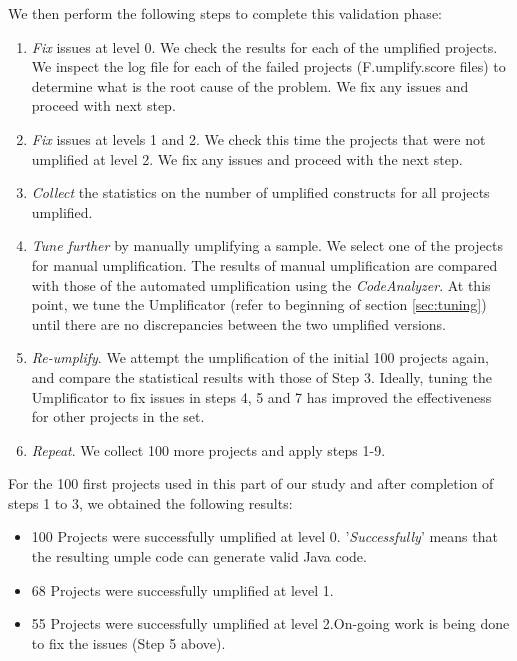 We then perform the following steps to complete this validation phase:

\begin{enumerate}[resume]
\item \textit{Fix} issues at level 0. We check the results for each of the umplified projects. We inspect the log file for each of the failed projects (F.umplify.score files) to determine what is the root cause of the problem. We fix any issues and proceed with next step.

\item \textit{Fix} issues at levels 1 and 2. We check this time the projects that were not umplified at level 2. We fix any issues and proceed with the next step.

\item \textit{Collect} the statistics on the number of umplified constructs for all projects umplified.

\item \textit{Tune further} by manually umplifying a sample. We select one of the projects for manual umplification. The results of manual umplification are compared with those of the automated umplification using the \textit{CodeAnalyzer}. At this point, we tune the Umplificator (refer to beginning of section \ref{sec:tuning}) until there are no discrepancies between the two umplified versions. 

\item \textit{Re-umplify}. We attempt the umplification of the initial 100 projects again, and compare the statistical results with those of Step 3. Ideally, tuning the Umplificator to fix issues in steps 4, 5 and 7 has improved the effectiveness for other projects in the set.

\item \textit{Repeat}. We collect 100 more projects and apply steps 1-9. 
\end{enumerate}

For the 100 first projects used in this part of our study and after completion of steps 1 to 3, we obtained the following results:

\begin{itemize}
\item 100 Projects were successfully umplified at level 0. '\textit{Successfully}' means that the resulting umple code can generate valid Java code.

\item 68 Projects were successfully umplified at level 1. 

\item 55 Projects were successfully umplified at level 2.On-going work is being done to fix the issues (Step 5 above).
\end{itemize}

